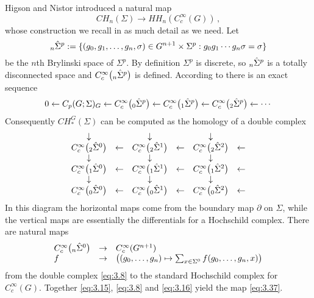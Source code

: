 Higson and Nistor \cite{HiNi} introduced a natural map
\begin{equation}\label{eq:3.37}
CH_n (\Sigma ) \to HH_n (C_c^\infty (G)) \,,
\end{equation}
whose construction we recall in as much detail as we need. Let 
\[
\prefix{}{_n}{\hat \Sigma^p} := \{ (g_0 ,g_1 ,\ldots, g_n ,\sigma ) \in
G^{n+1} \times \Sigma^p : g_0 g_1 \cdots g_n \sigma = \sigma \}
\]
be the $n$th Brylinski space of $\Sigma^p$. By definition $\Sigma^p$ is
discrete, so $\prefix{}{_n}{\hat \Sigma^p}$ is a totally disconnected
space and $C_c^\infty \big( \prefix{}{_n}{\hat \Sigma^p} \big)$ is
defined. According to \cite[Section 4]{HiNi} there is an exact sequence
\begin{equation}\label{eq:3.15}
0 \leftarrow C_p (G;\Sigma )_G \leftarrow C_c^\infty \big( 
\prefix{}{_0}{\hat \Sigma^p} \big) \leftarrow C_c^\infty \big( 
\prefix{}{_1}{\hat \Sigma^p} \big) \leftarrow C_c^\infty \big(
\prefix{}{_2}{\hat \Sigma^p} \big) \leftarrow \cdots
\end{equation}
Consequently $CH_*^G (\Sigma )$ can be computed as the homology of a
double complex
\begin{equation}\label{eq:3.8}
\begin{array}{cccccc}
\downarrow & & \downarrow & &\downarrow \\
C_c^\infty \big( \prefix{}{_2}{\hat \Sigma^0} \big) & \leftarrow & C_c^\infty \big(
\prefix{}{_2}{\hat \Sigma^1} \big) & \leftarrow & C_c^\infty \big(
\prefix{}{_2}{\hat \Sigma^2} \big) &  \leftarrow \\
\downarrow & & \downarrow & &\downarrow \\
C_c^\infty \big( \prefix{}{_1}{\hat \Sigma^0} \big) & \leftarrow & C_c^\infty \big(
\prefix{}{_1}{\hat \Sigma^1} \big) & \leftarrow & C_c^\infty \big(
\prefix{}{_1}{\hat \Sigma^2} \big) &  \leftarrow \\
\downarrow & & \downarrow & &\downarrow \\
C_c^\infty \big( \prefix{}{_0}{\hat \Sigma^0} \big) & \leftarrow & C_c^\infty \big(
\prefix{}{_0}{\hat \Sigma^1} \big) & \leftarrow & C_c^\infty \big(
\prefix{}{_0}{\hat \Sigma^2} \big) &  \leftarrow 
\end{array}
\end{equation}
In this diagram the horizontal maps come from the boundary map $\partial$ on
$\Sigma$, while the vertical maps are essentially the differentials for a 
Hochschild complex. There are natural maps 
\begin{equation}\label{eq:3.16}
\begin{array}{lll}
C_c^\infty \big( \prefix{}{_n}{\hat \Sigma^0} \big) & \to & C_c^\infty (G^{n+1}) \\
f & \to & \big( (g_0 ,\ldots ,g_n) \mapsto \sum_{x \in \Sigma^0} f (g_0 ,\ldots ,g_n, x) \big)
\end{array}
\end{equation}
from the double complex \eqref{eq:3.8} to the standard Hochschild complex for
$C_c^\infty (G)$. Together \eqref{eq:3.15}, \eqref{eq:3.8} and \eqref{eq:3.16} 
yield the map \eqref{eq:3.37}.


